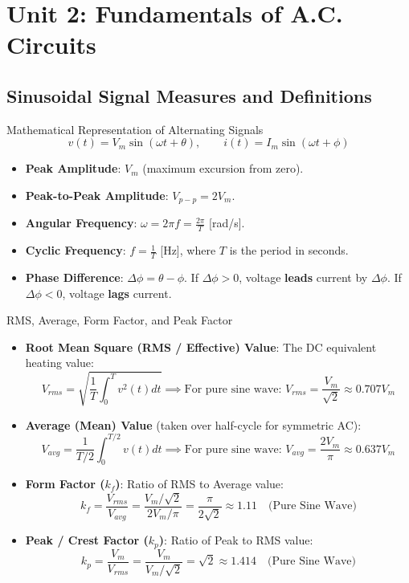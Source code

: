 \chapter{Unit 2: Fundamentals of A.C. Circuits}

\section{Sinusoidal Signal Measures and Definitions}

\begin{formulabox}{Mathematical Representation of Alternating Signals}
\[ v(t) = V_m \sin(\omega t + \theta), \qquad i(t) = I_m \sin(\omega t + \phi) \]
\begin{itemize}[leftmargin=1.5em]
    \item \textbf{Peak Amplitude}: $V_m$ (maximum excursion from zero).
    \item \textbf{Peak-to-Peak Amplitude}: $V_{p-p} = 2 V_m$.
    \item \textbf{Angular Frequency}: $\omega = 2\pi f = \frac{2\pi}{T}$ [rad/s].
    \item \textbf{Cyclic Frequency}: $f = \frac{1}{T}$ [Hz], where $T$ is the period in seconds.
    \item \textbf{Phase Difference}: $\Delta \phi = \theta - \phi$. If $\Delta \phi > 0$, voltage \textbf{leads} current by $\Delta \phi$. If $\Delta \phi < 0$, voltage \textbf{lags} current.
\end{itemize}
\end{formulabox}

\begin{formulabox}{RMS, Average, Form Factor, and Peak Factor}
\begin{itemize}[leftmargin=1.5em]
    \item \textbf{Root Mean Square (RMS / Effective) Value}: The DC equivalent heating value:
    \[ V_{rms} = \sqrt{\frac{1}{T}\int_0^T v^2(t) dt} \implies \text{For pure sine wave: } V_{rms} = \frac{V_m}{\sqrt{2}} \approx 0.707 V_m \]
    \item \textbf{Average (Mean) Value} (taken over half-cycle for symmetric AC):
    \[ V_{avg} = \frac{1}{T/2}\int_0^{T/2} v(t) dt \implies \text{For pure sine wave: } V_{avg} = \frac{2 V_m}{\pi} \approx 0.637 V_m \]
    \item \textbf{Form Factor ($k_f$)}: Ratio of RMS to Average value:
    \[ k_f = \frac{V_{rms}}{V_{avg}} = \frac{V_m / \sqrt{2}}{2 V_m / \pi} = \frac{\pi}{2\sqrt{2}} \approx 1.11 \quad \text{(Pure Sine Wave)} \]
    \item \textbf{Peak / Crest Factor ($k_p$)}: Ratio of Peak to RMS value:
    \[ k_p = \frac{V_m}{V_{rms}} = \frac{V_m}{V_m / \sqrt{2}} = \sqrt{2} \approx 1.414 \quad \text{(Pure Sine Wave)} \]
\end{itemize}
\end{formulabox}

